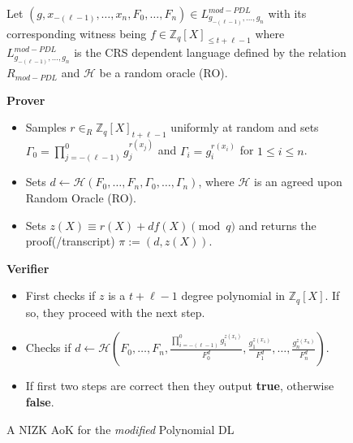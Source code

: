 \begin{figure}[ht]
    \centering
    \begin{tcolorbox}[title=$\pi_{mod-PDL}^{AoK}$, width=0.9\textwidth, colframe=blue!75!black, colback=blue!10, sharp corners]
        Let $(g,x_{-(\ell-1)},\dots,x_n,F_0,\dots,F_n)\in L_{g_{-(\ell-1)},\dots,g_n}^{mod-PDL}$ with its corresponding witness being $f\in\mathbb{Z}_q[X]_{\leq t+\ell-1}$ 
        where $L_{g_{-(\ell-1)},\dots,g_n}^{mod-PDL}$ is the CRS dependent language defined by 
        the relation $R_{mod-PDL}$ and $\mathcal{H}$ be a random oracle (RO).
        
        \vspace{0.5em}
        \textbf{Prover}
        \begin{itemize}
            \item Samples $r\in_{R}\mathbb{Z}_q[X]_{t+\ell-1}$ uniformly at random and sets 
                $\Gamma_0=\prod_{j=-(\ell-1)}^{0}g_j^{r(x_j)}$ and $\Gamma_i=g_i^{r(x_i)}$ for 
                $1\leq i\leq n$.
            \item Sets $d\leftarrow \mathcal{H}(F_0, \dots, F_n, \Gamma_0,\dots,\Gamma_n)$, where $\mathcal{H}$ is 
                an agreed upon Random Oracle (RO).
            \item Sets $z(X)\equiv r(X)+df(X) \pmod{q}$ and returns the proof(/transcript) $\pi:= (d,z(X))$.
        \end{itemize}
        
        \vspace{0.5em}
        \textbf{Verifier}
        \begin{itemize}
            \item First checks if $z$ is a $t+\ell-1$ degree polynomial in $\mathbb{Z}_q[X]$. If so, they proceed with the next step.
            \item Checks if $d\leftarrow \mathcal{H}(F_0, \dots, F_n,\frac{\prod_{i=-(\ell-1)}^{0}g_i^{z(x_i)}}{F_0^d},\frac{g_1^{z(x_1)}}{F_1^d},\dots,\frac{g_n^{z(x_n)}}{F_n^d})$. 
            \item If first two steps are correct then they output \textbf{true}, otherwise \textbf{false}.
        \end{itemize}
    \end{tcolorbox}
    \caption{A NIZK AoK for the \textit{modified} Polynomial DL}
    \label{fig:mod-polynomial-dl-init}
\end{figure}
